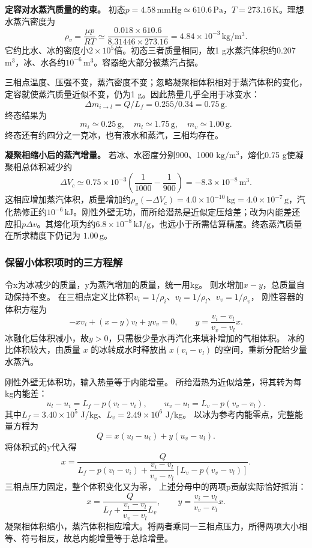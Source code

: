 \documentclass[UTF8,fontset=fandol,a4paper,11pt]{ctexart}
\newcommand{\result}[1]{\boxed{#1}}
\begin{document}
\textbf{定容对水蒸汽质量的约束。} 初态$p=4.58\,\mathrm{mmHg}\simeq610.6\,\mathrm{Pa}$，$T=273.16\,\mathrm K$。理想水蒸汽密度为
\[
\rho_v=\frac{\mu p}{RT}
\simeq\frac{0.018\times610.6}{8.31446\times273.16}
=4.84\times10^{-3}\,\mathrm{kg/m^3}.
\]
它约比水、冰的密度小$2\times10^5$倍。初态三者质量相同，故1 g水蒸汽体积约0.207 $\mathrm{m^3}$，冰、水各约$10^{-6}\,\mathrm{m^3}$。容器绝大部分被蒸汽占据。

三相点温度、压强不变，蒸汽密度不变；忽略凝聚相体积相对于蒸汽体积的变化，定容就使蒸汽质量近似不变，仍为1 g。因此热量几乎全用于冰变水：
\[
\Delta m_{i\to l}=Q/L_f=0.255/0.34=0.75\,\mathrm g.
\]
终态结果为
\[
\result{m_i\simeq0.25\,\mathrm g,\quad m_l\simeq1.75\,\mathrm g,\quad m_v\simeq1.00\,\mathrm g}.
\]
终态还有约四分之一克冰，也有液水和蒸汽，三相均存在。

\textbf{凝聚相缩小后的蒸汽增量。} 若冰、水密度分别900、1000 $\mathrm{kg/m^3}$，熔化0.75 g使凝聚相总体积减少约
\[
\Delta V_c\simeq0.75\times10^{-3}\left(\frac1{1000}-\frac1{900}\right)
=-8.3\times10^{-8}\,\mathrm{m^3}.
\]
这相应增加蒸汽体积，质量增加约$\rho_v(-\Delta V_c)=4.0\times10^{-10}\,\mathrm{kg}=4.0\times10^{-7}\,\mathrm g$，汽化热修正约$10^{-6}\,\mathrm{kJ}$。刚性外壁无功，而所给潜热是近似定压焓差；改为内能差还应扣$p\Delta v$。其熔化项为约$6.8\times10^{-8}\,\mathrm{kJ/g}$，也远小于所需估算精度。终态蒸汽质量在所求精度下仍记为 $1.00\,\mathrm g$。
\subsubsection*{保留小体积项时的三方程解}
令x为冰减少的质量，y为蒸汽增加的质量，统一用kg。
则水增加$x-y$，总质量自动保持不变。
在三相点定义比体积$v_i=1/\rho_i$、$v_l=1/\rho_l$、$v_v=1/\rho_v$，
刚性容器的体积方程为
\[
-xv_i+(x-y)v_l+yv_v=0,
\qquad y=\frac{v_i-v_l}{v_v-v_l}x.
\]
冰融化后体积减小，故$y>0$，只需极少量水再汽化来填补增加的气相体积。
冰的比体积较大，由质量 $x$ 的冰转成水时释放出 $x(v_i-v_l)$ 的空间，重新分配给少量水蒸汽。

刚性外壁无体积功，输入热量等于内能增量。
所给潜热为近似焓差，将其转为每kg内能差：
\[
u_l-u_i=L_f-p(v_l-v_i),\qquad
u_v-u_l=L_v-p(v_v-v_l).
\]
其中$L_f=3.40\times10^5$ J/kg、$L_v=2.49\times10^6$ J/kg。
以冰为参考内能零点，完整能量方程为
\[
Q=x(u_l-u_i)+y(u_v-u_l).
\]
将体积式的y代入得
\[
x=\frac{Q}{L_f-p(v_l-v_i)
+\dfrac{v_i-v_l}{v_v-v_l}[L_v-p(v_v-v_l)]}.
\]
三相点压力固定，整个体积变化又为零，
上述分母中的两项p贡献实际恰好抵消：
\[
x=\frac{Q}{L_f+\dfrac{v_i-v_l}{v_v-v_l}L_v},\qquad
y=\frac{v_i-v_l}{v_v-v_l}x.
\]
凝聚相体积缩小，蒸汽体积相应增大。将两者乘同一三相点压力，所得两项大小相等、符号相反，故总内能增量等于总焓增量。
\end{document}
